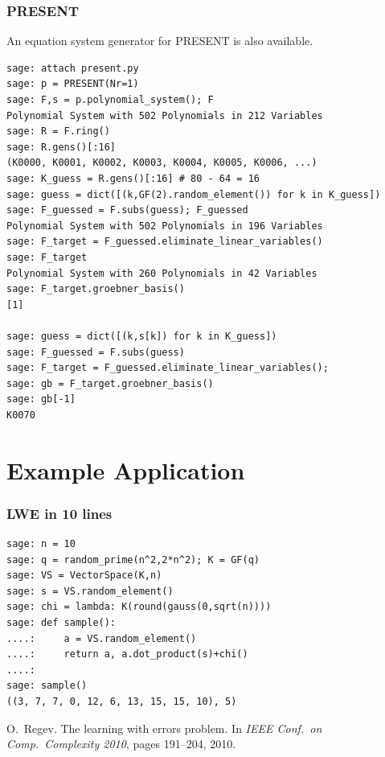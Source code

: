 \documentclass[10pt]{beamer}
\begin{document}
\begin{frame}[fragile]
\frametitle{PRESENT}

An equation system generator for PRESENT is also available.

\begin{lstlisting}
sage: attach present.py
sage: p = PRESENT(Nr=1)
sage: F,s = p.polynomial_system(); F
Polynomial System with 502 Polynomials in 212 Variables
sage: R = F.ring()
sage: R.gens()[:16]
(K0000, K0001, K0002, K0003, K0004, K0005, K0006, ...)
sage: K_guess = R.gens()[:16] # 80 - 64 = 16
sage: guess = dict([(k,GF(2).random_element()) for k in K_guess])
sage: F_guessed = F.subs(guess); F_guessed
Polynomial System with 502 Polynomials in 196 Variables
sage: F_target = F_guessed.eliminate_linear_variables()
sage: F_target
Polynomial System with 260 Polynomials in 42 Variables
sage: F_target.groebner_basis()
[1]

sage: guess = dict([(k,s[k]) for k in K_guess])
sage: F_guessed = F.subs(guess)
sage: F_target = F_guessed.eliminate_linear_variables();
sage: gb = F_target.groebner_basis()
sage: gb[-1]
K0070
\end{lstlisting}
\end{frame}

\section{Example Application}

\begin{frame}[fragile]
\frametitle{LWE in 10 lines}
\begin{lstlisting}
sage: n = 10
sage: q = random_prime(n^2,2*n^2); K = GF(q)
sage: VS = VectorSpace(K,n)
sage: s = VS.random_element()
sage: chi = lambda: K(round(gauss(0,sqrt(n))))
sage: def sample():
....:     a = VS.random_element()
....:     return a, a.dot_product(s)+chi()
....:
sage: sample()
((3, 7, 7, 0, 12, 6, 13, 15, 15, 10), 5)
\end{lstlisting}

\begin{thebibliography}{ff}
O.\ Regev.
\newblock The learning with errors problem.
\newblock In {\em IEEE Conf.\ on Comp.\ Complexity 2010}, pages
  191--204, 2010.
\end{thebibliography}


\end{frame}
\end{document}
